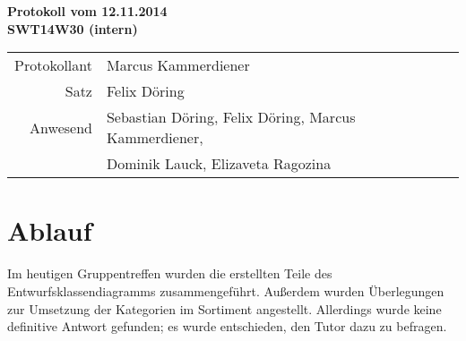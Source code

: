 \documentclass{scrartcl}
\begin{document}
\begin{center}
\LARGE \bf{Protokoll vom 12.11.2014 \\
SWT14W30 (intern)}
\end{center}

\begin{tabular}{rp{10cm}}
Protokollant & Marcus Kammerdiener \\
Satz & Felix Döring \\
Anwesend & Sebastian Döring, Felix Döring, Marcus Kammerdiener,\\
& Dominik Lauck, Elizaveta Ragozina \\
\end{tabular}

\vspace*{3em}

\section{Ablauf}
Im heutigen Gruppentreffen wurden die erstellten Teile des Entwurfsklassendiagramms zusammengeführt.
Außerdem wurden Überlegungen zur Umsetzung der Kategorien im Sortiment angestellt. Allerdings wurde
keine definitive Antwort gefunden; es wurde entschieden, den Tutor dazu zu befragen.
\end{document}
